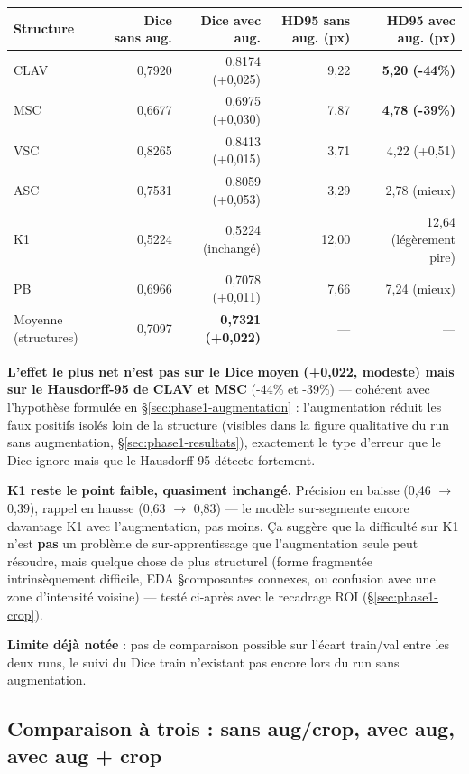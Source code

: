 \begin{center}
\begin{tabular}{lrrrr}
\toprule
Structure & Dice sans aug. & Dice avec aug. & HD95 sans aug. (px) & HD95 avec aug. (px) \\
\midrule
CLAV & 0,7920 & 0,8174 (+0,025) & 9,22 & \textbf{5,20 (-44\%)} \\
MSC  & 0,6677 & 0,6975 (+0,030) & 7,87 & \textbf{4,78 (-39\%)} \\
VSC  & 0,8265 & 0,8413 (+0,015) & 3,71 & 4,22 (+0,51) \\
ASC  & 0,7531 & 0,8059 (+0,053) & 3,29 & 2,78 (mieux) \\
K1   & 0,5224 & 0,5224 (inchangé) & 12,00 & 12,64 (légèrement pire) \\
PB   & 0,6966 & 0,7078 (+0,011) & 7,66 & 7,24 (mieux) \\
\midrule
Moyenne (structures) & 0,7097 & \textbf{0,7321 (+0,022)} & --- & --- \\
\bottomrule
\end{tabular}
\end{center}

\textbf{L'effet le plus net n'est pas sur le Dice moyen (+0,022, modeste) mais sur le
Hausdorff-95 de CLAV et MSC} (-44\% et -39\%) --- cohérent avec l'hypothèse formulée en
\S\ref{sec:phase1-augmentation} : l'augmentation réduit les faux positifs isolés loin
de la structure (visibles dans la figure qualitative du run sans augmentation,
\S\ref{sec:phase1-resultats}), exactement le type d'erreur que le Dice ignore mais que
le Hausdorff-95 détecte fortement.

\textbf{K1 reste le point faible, quasiment inchangé.} Précision en baisse (0,46
$\to$ 0,39), rappel en hausse (0,63 $\to$ 0,83) --- le modèle sur-segmente encore
davantage K1 avec l'augmentation, pas moins. Ça suggère que la difficulté sur K1
n'est \textbf{pas} un problème de sur-apprentissage que l'augmentation seule peut
résoudre, mais quelque chose de plus structurel (forme fragmentée intrinsèquement
difficile, EDA \S composantes connexes, ou confusion avec une zone d'intensité
voisine) --- testé ci-après avec le recadrage ROI (\S\ref{sec:phase1-crop}).

\textbf{Limite déjà notée} : pas de comparaison possible sur l'écart train/val entre
les deux runs, le suivi du Dice train n'existant pas encore lors du run sans
augmentation.

\subsection{Comparaison à trois : sans aug/crop, avec aug, avec aug + crop}
\label{sec:phase1-comparaison-3way}


